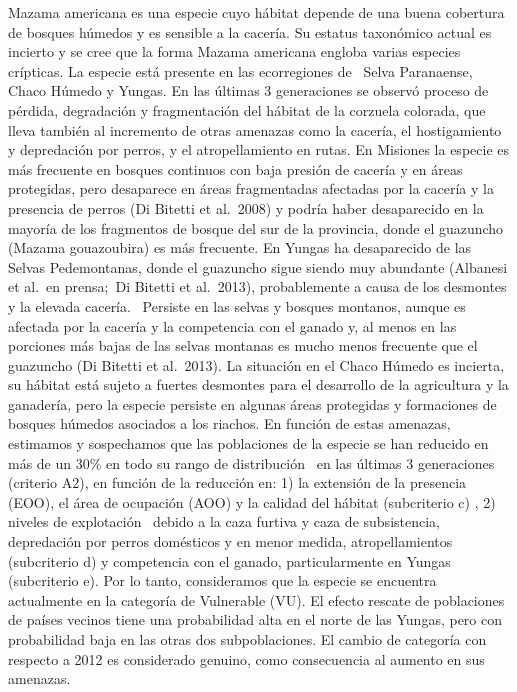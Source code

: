 \documentclass[
  x11names]{article}
\begin{document}
Mazama americana es una especie cuyo hábitat depende de una buena
cobertura de bosques húmedos y es sensible a la cacería. Su estatus
taxonómico actual es incierto y se cree que la forma Mazama americana
engloba varias especies crípticas. La especie está presente en las
ecorregiones de~ Selva Paranaense, Chaco Húmedo y Yungas. En las últimas
3 generaciones se observó proceso de pérdida, degradación y
fragmentación del hábitat de la corzuela colorada, que lleva también al
incremento de otras amenazas como la cacería, el hostigamiento y
depredación por perros, y el atropellamiento en rutas. En Misiones la
especie es más frecuente en bosques continuos con baja presión de
cacería y en áreas protegidas, pero desaparece en áreas fragmentadas
afectadas por la cacería y la presencia de perros (Di Bitetti et
al.~2008) y podría haber desaparecido en la mayoría de los fragmentos de
bosque del sur de la provincia, donde el guazuncho (Mazama gouazoubira)
es más frecuente. En Yungas ha desaparecido de las Selvas Pedemontanas,
donde el guazuncho sigue siendo muy abundante (Albanesi et al.~en
prensa;~Di Bitetti et al.~2013), probablemente a causa de los desmontes
y la elevada cacería.~ Persiste en las selvas y bosques montanos, aunque
es afectada por la cacería y la competencia con el ganado y, al menos en
las porciones más bajas de las selvas montanas es mucho menos frecuente
que el guazuncho (Di Bitetti et al.~2013). La situación en el Chaco
Húmedo es incierta, su hábitat está sujeto a fuertes desmontes para el
desarrollo de la agricultura y la ganadería, pero la especie persiste en
algunas áreas protegidas y formaciones de bosques húmedos asociados a
los riachos. En función de estas amenazas, estimamos y sospechamos que
las poblaciones de la especie se han reducido en más de un 30\% en todo
su rango de distribución~ en las últimas 3 generaciones (criterio A2),
en función de la reducción en: 1) la extensión de la presencia (EOO), el
área de ocupación (AOO) y la calidad del hábitat (subcriterio c) , 2)
niveles de explotación~ debido a la caza furtiva y caza de subsistencia,
depredación por perros domésticos y en menor medida, atropellamientos
(subcriterio d) y competencia con el ganado, particularmente en Yungas
(subcriterio e). Por lo tanto, consideramos que la especie se encuentra
actualmente en la categoría de Vulnerable (VU). El efecto rescate de
poblaciones de países vecinos tiene una probabilidad alta en el norte de
las Yungas, pero con probabilidad baja en las otras dos subpoblaciones.
El cambio de categoría con respecto a 2012 es considerado genuino, como
consecuencia al aumento en sus amenazas.
\end{document}
